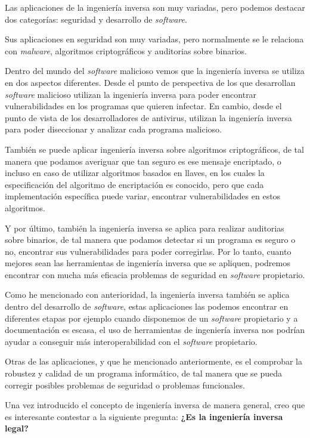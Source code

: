 Las aplicaciones de la ingeniería inversa son muy variadas, pero podemos destacar dos
categorías: seguridad y desarrollo de \textit{software}.

Sus aplicaciones en seguridad son muy variadas, pero normalmente se le relaciona con
\textit{malware}, algoritmos criptográficos y auditorias sobre binarios.

Dentro del mundo del \textit{software} malicioso vemos que la ingeniería inversa se
utiliza en dos aspectos diferentes. Desde el punto de perspectiva de los que desarrollan
\textit{software} malicioso utilizan la ingeniería inversa para poder encontrar
vulnerabilidades en los programas que quieren infectar. En cambio, desde el punto de vista
de los desarrolladores de antivirus, utilizan la ingeniería inversa para poder diseccionar
y analizar cada programa malicioso.

También se puede aplicar ingeniería inversa sobre algoritmos criptográficos, de tal manera
que podamos averiguar que tan seguro es ese mensaje encriptado, o incluso en caso de utilizar
algoritmos basados en llaves, en los cuales la especificación del algoritmo de encriptación
es conocido, pero que cada implementación específica puede variar, encontrar vulnerabilidades
en estos algoritmos.

Y por último, también la ingeniería inversa se aplica para realizar auditorias sobre binarios,
de tal manera que podamos detectar si un programa es seguro o no, encontrar sus vulnerabilidades
para poder corregirlas. Por lo tanto, cuanto mejores sean las herramientas de ingeniería inversa
que se apliquen, podremos encontrar con mucha más eficacia problemas de seguridad en \textit{software}
propietario.

Como he mencionado con anterioridad, la ingeniería inversa también se aplica dentro del desarrollo
de \textit{software}, estas aplicaciones las podemos encontrar en diferentes etapas por ejemplo
cuando disponemos de un \textit{software} propietario y a documentación es escasa, el uso de
herramientas de ingeniería inversa nos podrían ayudar a conseguir más interoperabilidad con
el \textit{software} propietario.

Otras de las aplicaciones, y que he mencionado anteriormente, es el comprobar la robustez y calidad
de un programa informático, de tal manera que se pueda corregir posibles problemas de seguridad o
problemas funcionales.

Una vez introducido el concepto de ingeniería inversa de manera general, creo que es interesante
contestar a la siguiente pregunta: \textbf{¿Es la ingeniería inversa legal?}

